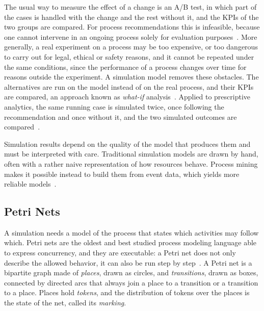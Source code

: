     The usual way to measure the effect of a change is an A/B test, in which part
    of the cases is handled with the change and the rest without it, and the KPIs
    of the two groups are compared. For process recommendations this is
    infeasible, because one cannot intervene in an ongoing process solely for
    evaluation purposes~\cite{le2025balancing}. More generally, a real experiment
    on a process may be too expensive, or too dangerous to carry out for legal,
    ethical or safety reasons, and it cannot be repeated under the same
    conditions, since the performance of a process changes over time for reasons
    outside the
    experiment. A simulation model removes these
    obstacles. The alternatives are run on the model instead of on the real
    process, and their KPIs are compared, an approach known as \emph{what-if}
    analysis~\cite{vanderaalst2015simulation,vinci2025prosit}. Applied to
    prescriptive analytics, the same running case is simulated twice, once
    following the recommendation and once without it, and the two simulated
    outcomes are compared~\cite{le2025balancing}.
    
    Simulation results depend on the quality of the model that produces them
    and must be interpreted with care. Traditional simulation models are drawn
    by hand, often with a rather naive representation of how resources behave.
    Process mining makes it possible instead to build them from event data, which
    yields more reliable models~\cite{vanderaalst2015simulation}.
    
    \subsection{Petri Nets}
    \label{subsec:bg:simulation:petri}
    A simulation needs a model of the process that states which activities may
    follow which. Petri nets are the oldest and best studied process modeling
    language able to express concurrency, and they are executable: a Petri net
    does not only describe the allowed behavior, it can also be run step by
    step~\cite{vanderaalst2016}. A Petri net is a bipartite graph made of
    \emph{places}, drawn as circles, and \emph{transitions}, drawn as boxes,
    connected by directed arcs that always join a place to a transition or a
    transition to a place. Places hold \emph{tokens}, and the distribution of
    tokens over the places is the state of the net, called its
    \emph{marking}.
    
